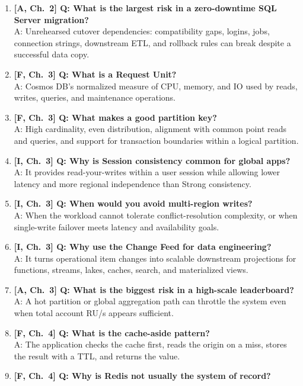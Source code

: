 \begin{enumerate}
    A: Hyperscale separates compute from distributed page and log storage for very large databases and fast restore; Business Critical focuses on local SSD replicas and low-latency IO.
    \item \textbf{[A, Ch.~2] Q: What is the largest risk in a zero-downtime SQL Server migration?}\\
    A: Unrehearsed cutover dependencies: compatibility gaps, logins, jobs, connection strings, downstream ETL, and rollback rules can break despite a successful data copy.
    \item \textbf{[F, Ch.~3] Q: What is a Request Unit?}\\
    A: Cosmos DB's normalized measure of CPU, memory, and IO used by reads, writes, queries, and maintenance operations.
    \item \textbf{[F, Ch.~3] Q: What makes a good partition key?}\\
    A: High cardinality, even distribution, alignment with common point reads and queries, and support for transaction boundaries within a logical partition.
    \item \textbf{[I, Ch.~3] Q: Why is Session consistency common for global apps?}\\
    A: It provides read-your-writes within a user session while allowing lower latency and more regional independence than Strong consistency.
    \item \textbf{[I, Ch.~3] Q: When would you avoid multi-region writes?}\\
    A: When the workload cannot tolerate conflict-resolution complexity, or when single-write failover meets latency and availability goals.
    \item \textbf{[I, Ch.~3] Q: Why use the Change Feed for data engineering?}\\
    A: It turns operational item changes into scalable downstream projections for functions, streams, lakes, caches, search, and materialized views.
    \item \textbf{[A, Ch.~3] Q: What is the biggest risk in a high-scale leaderboard?}\\
    A: A hot partition or global aggregation path can throttle the system even when total account RU/s appears sufficient.
    \item \textbf{[F, Ch.~4] Q: What is the cache-aside pattern?}\\
    A: The application checks the cache first, reads the origin on a miss, stores the result with a TTL, and returns the value.
    \item \textbf{[F, Ch.~4] Q: Why is Redis not usually the system of record?}\\

\end{enumerate}
